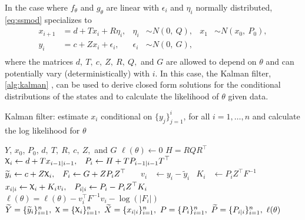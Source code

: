 \documentclass[12pt]{article}
\DeclareRobustCommand{\varx}{{\mathpalette\irchi\relax}}
\newcommand{\irchi}[2]{\protect\raisebox{\depth}{$#1\upchi$}}
\begin{document}
In the case where $f_\theta$ and $g_\theta$ are linear with $\epsilon_i$ and
$\eta_i$ normally distributed, \eqref{eq:ssmod} specializes to
\begin{equation}
  \begin{aligned}
    x_{i+1}&= d+T x_i + R\eta_{i}, 
    & \eta_i &\sim N(0,\ Q),     
    &x_1 &\sim N(x_0,\ P_0),\\
    y_i&= c + Z x_i + \epsilon_i,     
    & \epsilon_i &\sim N(0,\ G), \\
  \end{aligned}
  \label{eq:lgmod}
\end{equation}
where the matrices $d,\ T,\ c,\ Z,\ R,\ Q,$ and $G$ are allowed to depend
on $\theta$ and can potentially vary (deterministically) with $i$. In this case,
the Kalman filter, \autoref{alg:kalman} \citep[see e.g.][]{Kalman1960,Harvey1990},
can be used to derive closed form 
solutions for the conditional
distributions of the states and to calculate the likelihood of $\theta$
given data. 
\begin{algorithm}[t!]
  \begin{singlespace}
  \caption{Kalman filter: estimate $x_i$ conditional on
    $\{y_j\}_{j=1}^i$, for all $i=1,\ldots,n$ and calculate the log likelihood
    for $\theta$\label{alg:kalman}}
  \begin{algorithmic}
     $Y$, $x_0$, $P_0$, $d,\ T,\ R,\ c,\ Z,$ and $G$
    \STATE $\ell(\theta) \leftarrow 0$ 
    \STATE $H = RQR^\top$ 
    \STATE $\begin{aligned}\varx_{i}
      &\leftarrow d + T x_{i-1|i-1}, & P_i &\leftarrow H + T P_{i-1|i-1}
      T^\top\end{aligned}$ 
    \STATE $\begin{aligned}\widetilde{y}_i
      &\leftarrow c + Z \varx_i, & F_i &\leftarrow G + Z P_i
      Z^\top\end{aligned}$ 
    \STATE $\begin{aligned}v_i&\leftarrow y_i-\widetilde{y}_i& K_i&
      \leftarrow P_i Z^\top F^{-1}\end{aligned}$ 
    \STATE $\begin{aligned} x_{i|i}
      &\leftarrow \varx_i + K_i v_i, & P_{i|i} &\leftarrow P_i - P_iZ^\top
      K_i\end{aligned}$ 
    \STATE $\ell(\theta) = \ell(\theta) -v_i^\top F^{-1}v_i - \log(|F_i|)$
    \ENDFOR
    \RETURN $\widetilde{Y}=\{\widetilde{y}_i\}_{i=1}^n,\ \varx=\{\varx_i\}_{i=1}^n,\
    \widetilde{X}=\{x_{i|i}\}_{i=1}^n,\ P=\{P_i\}_{i=1}^n,\
    \widetilde{P}=\{P_{i|i}\}_{i=1}^n,\ \ell(\theta)$
  \end{algorithmic}
\end{singlespace}
\end{algorithm}
\end{document}

